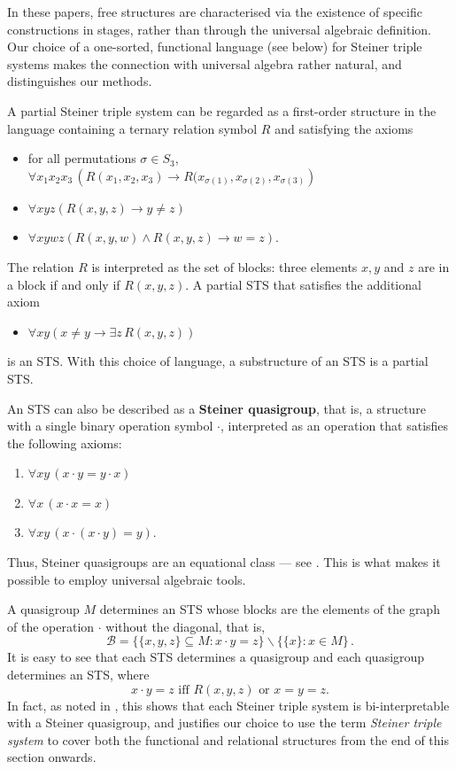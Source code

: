 \documentclass[a4paper, 11pt]{article}
\theoremstyle{note}
\begin{document}
In these papers, free structures are characterised via the existence of specific constructions in stages, rather than through the universal algebraic definition. Our choice of a one-sorted, functional language (see below) for Steiner triple systems makes the connection with universal algebra rather natural, and distinguishes our methods.

A  partial Steiner triple system can be regarded as a first-order structure in the language containing a ternary relation symbol $R$ and satisfying the axioms
\begin{itemize}
\item for all permutations $\sigma \in S_3$, $ \forall x_1 x_2 x_3 \, \left(R(x_1, x_2, x_3) \rightarrow R(x_{\sigma(1)}, x_{\sigma(2)}, x_{\sigma(3)} \right)$
\item $\forall x y z \left( R(x,y,z) \rightarrow y\neq z \right)$
\item $\forall x y w z \left( R(x,y,w) \wedge R(x,y,z) \rightarrow w=z \right)$.
\end{itemize}
The relation $R$ is interpreted as the set of blocks: three elements $x, y$ and $z$ are in a block if and only if $R(x,y,z)$.  A partial STS that satisfies the additional axiom
\begin{itemize}
\item $\forall x y \left( x \neq y \rightarrow \exists z \,R(x,y,z)\right)$
\end{itemize}
is an STS.
With this choice of language, a substructure of an STS is a partial STS.

An STS can also be described as a \textbf{Steiner quasigroup}, that is, a structure with a single binary operation symbol $\cdot$, interpreted as an operation that satisfies the following axioms:
 \begin{enumerate}
\item $\forall x y \, (x \cdot y= y\cdot x)$
\item $\forall x \, (x\cdot x =x)$
\item $\forall x y \, (x\cdot (x\cdot y)=y)$.
\end{enumerate}
Thus, Steiner quasigroups are an equational class --- see \cite{ganter1, ganter2}. This is what makes it possible to employ universal algebraic tools.

A quasigroup $M$ determines an STS whose blocks are the elements of the graph of the operation $\cdot$ without the diagonal, that is,
\[ \mathcal{B} = \{ \{x,y,z \} \subseteq M : x \cdot y = z \} \smallsetminus \{ \{x \} : x \in M \} \, .\]
It is easy to see that each STS determines a quasigroup and each quasigroup determines an STS, where
  $$x \cdot y = z \mbox{ iff } R(x,y,z) \mbox{ or } x=y=z.$$  In fact, as  noted in \cite{ganter1, ganter2}, this shows that each Steiner triple system is bi-interpretable with a Steiner quasigroup, and justifies our choice to use the term \textit{Steiner triple system} to cover both the functional and relational structures from the end of this section onwards.
\end{document}
